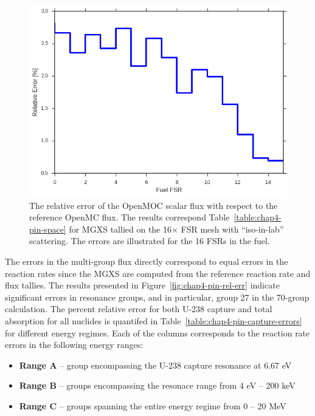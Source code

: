 \begin{figure}[H]
  \centering
  \includegraphics[width=0.8\linewidth]{figures/biases/pin-cell/rel-err-fuel-fsrs}
\caption[Flux relative error by fuel FSR for a 2D fuel pin.]{The relative error of the OpenMOC scalar flux with respect to the reference OpenMC flux. The results correspond Table~\ref{table:chap4-pin-space} for \ac{MGXS} tallied on the 16$\times$ \ac{FSR} mesh with ``iso-in-lab'' scattering. The errors are illustrated for the 16 \ac{FSR}s in the fuel.}
\label{fig:chap4-pin-fuel-fsrs}
\end{figure}

The errors in the multi-group flux directly correspond to equal errors in the reaction rates since the \ac{MGXS} are computed from the reference reaction rate and flux tallies. The results presented in Figure~\ref{fig:chap4-pin-rel-err} indicate significant errors in resonance groups, and in particular, group 27 in the 70-group calculation. The percent relative error for both U-238 capture and total absorption for all nuclides is quantifed in Table~\ref{table:chap4-pin-capture-errors} for different energy regimes. Each of the columns corresponds to the reaction rate errors in the following energy ranges:

\vspace{-0.1in}
\begin{itemize}[noitemsep]
  \item {\bf Range A} -- group encompassing the U-238 capture resonance at 6.67 eV
  \item {\bf Range B} -- groups encompassing the resonace range from 4 eV -- 200 keV
  \item {\bf Range C} -- groups spanning the entire energy regime from 0 -- 20 MeV
\end{itemize}
\vspace{-0.1in}

